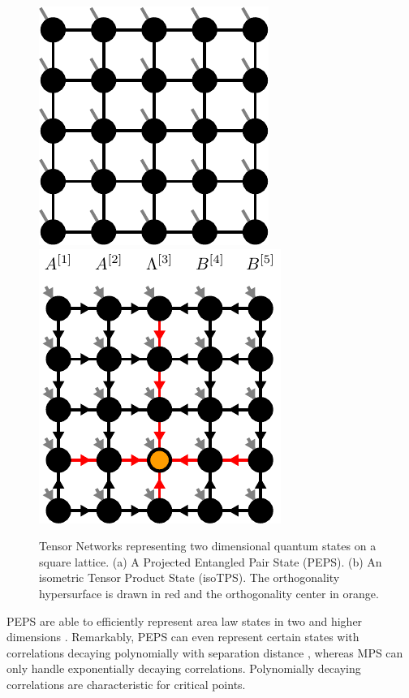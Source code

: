 \begin{figure}
	\centering
	\subcaptionbox{\label{fig:square_PEPS}}
	{%
		\includegraphics[scale=1]{figures/tikz/Tensor_Networks/isoTPS_structure/isoTPS_structure_a.pdf}
	}
	\quad\quad
	\subcaptionbox{\label{fig:square_isoTPS}}
	{%
		\includegraphics[scale=1]{figures/tikz/Tensor_Networks/isoTPS_structure/isoTPS_structure_b.pdf}
	}
	\caption{Tensor Networks representing two dimensional quantum states on a square lattice. (a) A Projected Entangled Pair State (PEPS). (b) An isometric Tensor Product State (isoTPS). The orthogonality hypersurface is drawn in red and the orthogonality center in orange.}
	\label{fig:square_PEPS_and_isoTPS}
\end{figure}
PEPS are able to efficiently represent area law states in two and higher dimensions \cite{cite:practical_introduction_MPS_and_PEPS}. Remarkably, PEPS can even represent certain states with correlations decaying polynomially with separation distance \cite{cite:criticality_the_area_law_and_the_computational_power_of_PEPS}, whereas MPS can only handle exponentially decaying correlations. Polynomially decaying correlations are characteristic for critical points. \par
